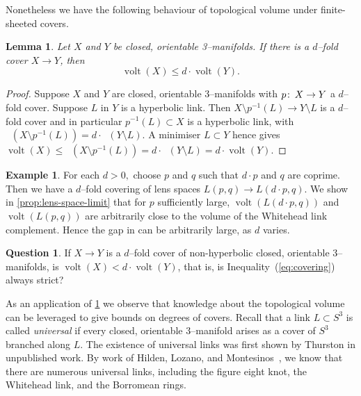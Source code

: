 \documentclass[a4paper]{gtart}
\newtheorem{lemma}[proposition]{Lemma}
\theoremstyle{definition}
\newtheorem{question}[proposition]{Question}
\newtheorem{example}[proposition]{Example}
\theoremstyle{remark}
\numberwithin{equation}{section}
\DeclareMathOperator{\volt}{volt}
\DeclareMathOperator{\volh}{vol_{\mathbb{H}}}
\begin{document}
Nonetheless we have the following behaviour of topological volume under finite-sheeted covers. 

\begin{lemma}\label{lem:covers}
Let $X$ and $Y$ be closed, orientable 3--manifolds. If there is a $d$--fold cover $X\to  Y$, then 
\begin{equation}
\label{eq:covering}
\volt(X) \leq  d\cdot \volt(Y).
\end{equation}
\end{lemma}

\begin{proof}
Suppose $X$ and $Y$ are closed, orientable 3--manifolds with $p\colon\thinspace X \to Y$ a $d$--fold cover.
Suppose $L $ in $Y$ is a hyperbolic link. Then $X \setminus p^{-1}(L) \to Y \setminus L$ is a $d$--fold cover and in particular $p^{-1}(L) \subset X$ is a hyperbolic link, with $\volh (X \setminus p^{-1}(L)) =d \cdot  \volh(Y \setminus L)$. A minimiser $L \subset Y$  hence gives 
$\volt(X) \le \volh (X \setminus p^{-1}(L)) =d \cdot  \volh(Y \setminus L) = d \cdot  \volt(Y).$
\end{proof}

\begin{example}
For each $d>0,$ choose $p$ and $q$ such that $d \cdot p$ and $q$ are coprime. Then we have a $d$--fold covering of lens spaces 
$L(p, q) \to L(d\cdot p,q).$
 We show in \cref{prop:lens-space-limit} that for $p$ sufficiently large, $\volt(L(d\cdot p, q))$ and $\volt(L(p, q))$ are arbitrarily close to the volume of the Whitehead link complement. Hence the gap in  can be arbitrarily large, as $d$ varies.
\end{example}

\begin{question}
If $X\to  Y$ is a $d$--fold cover of non-hyperbolic closed, orientable 3--manifolds, is $\volt(X) <  d\cdot \volt(Y)$, that is, is Inequality~(\ref{eq:covering}) always strict?
\end{question}

As an application of \cref{lem:covers} we observe that knowledge about the topological volume can be leveraged to give bounds on degrees of covers. Recall that a link $L\subset S^3$ is called \emph{universal} if every closed, orientable 3--manifold arises as a cover of $S^3$ branched along $L$. The existence of universal links was first shown by Thurston in unpublished work. By work of Hilden, Lozano, and Montesinos~\cite{HLM2,HLM4,HLM3}, we know that there are numerous universal links, including the figure eight knot, the Whitehead link, and the Borromean rings.
\end{document}

